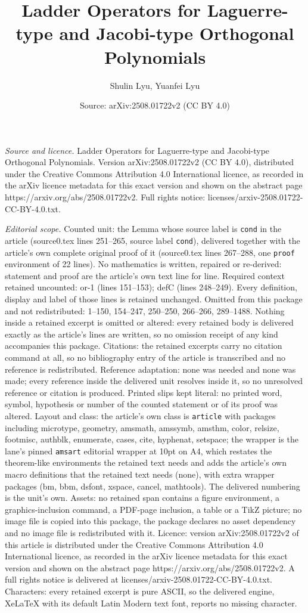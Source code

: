 \documentclass[10pt,a4paper]{amsart}
\title[Ladder Operators for Laguerre-type and Jacobi-type Orthogona]{Ladder Operators for Laguerre-type and Jacobi-type Orthogonal Polynomials}
\author{Shulin Lyu, Yuanfei Lyu}
\date{Source: arXiv:2508.01722v2 (CC BY 4.0)}
\begin{document}
\maketitle

\noindent\emph{Source and licence.} Ladder Operators for Laguerre-type and Jacobi-type Orthogonal Polynomials. Version arXiv:2508.01722v2 (CC BY 4.0), distributed under the Creative Commons Attribution 4.0 International licence, as recorded in the arXiv licence metadata for this exact version and shown on the abstract page https://arxiv.org/abs/2508.01722v2. Full rights notice: licenses/arxiv-2508.01722-CC-BY-4.0.txt.\par\smallskip

\noindent\textit{Editorial scope.} Counted unit: the Lemma whose source label is \texttt{cond} in the article (source0.tex lines 251--265, source label \texttt{cond}), delivered together with the article's own complete original proof of it (source0.tex lines 267--288, one \texttt{proof} environment of 22 lines). No mathematics is written, repaired or re-derived: statement and proof are the article's own text line for line. Required context retained uncounted: or-1 (lines 151--153); defC (lines 248--249). Every definition, display and label of those lines is retained unchanged. Omitted from this package and not redistributed: 1--150, 154--247, 250--250, 266--266, 289--1488. Nothing inside a retained excerpt is omitted or altered: every retained body is delivered exactly as the article's lines are written, so no omission receipt of any kind accompanies this package. Citations: the retained excerpts carry no citation command at all, so no bibliography entry of the article is transcribed and no reference is redistributed. Reference adaptation: none was needed and none was made; every reference inside the delivered unit resolves inside it, so no unresolved reference or citation is produced. Printed slips kept literal: no printed word, symbol, hypothesis or number of the counted statement or of its proof was altered. Layout and class: the article's own class is \texttt{article} with packages including microtype, geometry, amsmath, amssymb, amsthm, color, relsize, footmisc, authblk, enumerate, cases, cite, hyphenat, setspace; the wrapper is the lane's pinned \texttt{amsart} editorial wrapper at 10pt on A4, which restates the theorem-like environments the retained text needs and adds the article's own macro definitions that the retained text needs (none), with extra wrapper packages (bm, bbm, dsfont, xspace, cancel, mathtools). The delivered numbering is the unit's own. Assets: no retained span contains a figure environment, a graphics-inclusion command, a PDF-page inclusion, a table or a TikZ picture; no image file is copied into this package, the package declares no asset dependency and no image file is redistributed with it. Licence: version arXiv:2508.01722v2 of this article is distributed under the Creative Commons Attribution 4.0 International licence, as recorded in the arXiv licence metadata for this exact version and shown on the abstract page https://arxiv.org/abs/2508.01722v2. A full rights notice is delivered at licenses/arxiv-2508.01722-CC-BY-4.0.txt. Characters: every retained excerpt is pure ASCII, so the delivered engine, XeLaTeX with its default Latin Modern text font, reports no missing character.
\end{document}

